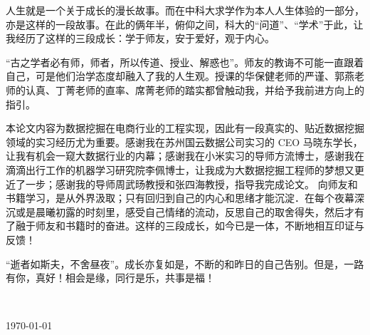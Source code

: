 
\begin{thanks}

人生就是一个关于成长的漫长故事。而在中科大求学作为本人人生体验的一部分，亦是这样的一段故事。在此的俩年半，俯仰之间，科大的“问道”、“学术”于此，让我经历了这样的三段成长：学于师友，安于爱好，观于内心。

“古之学者必有师，师者，所以传道、授业、解惑也”。师友的教诲不可能一直跟着自己，可是他们治学态度却融入了我的人生观。授课的华保健老师的严谨、郭燕老师的认真、丁菁老师的直率、席菁老师的踏实都曾触动我，并给予我前进方向上的指引。

本论文内容为数据挖掘在电商行业的工程实现，因此有一段真实的、贴近数据挖掘领域的实习经历尤为重要。感谢我在苏州国云数据公司实习的 CEO 马晓东学长，让我有机会一窥大数据行业的内幕；感谢我在小米实习的导师方流博士，感谢我在滴滴出行工作的机器学习研究院李佩博士，让我成为大数据挖掘工程师的梦想又更近了一步；感谢我的导师周武旸教授和张四海教授，指导我完成论文。
向师友和书籍学习，是从外界汲取；只有回归到自己的内心和思绪才能沉淀．在每个夜幕深沉或是晨曦初露的时刻里，感受自己情绪的流动，反思自己的取舍得失，然后才有了融于师友和书籍时的奋进。这样的三段成长，如今已是一体，不断地相互印证与反馈！

“逝者如斯夫，不舍昼夜”。成长亦复如是，不断的和昨日的自己告别。但是，一路有你，真好！相会是缘，同行是乐，共事是福！

\vskip 18pt

\begin{flushright}

~~~~\ustc@author~~~~

\today

\end{flushright}

\end{thanks}
